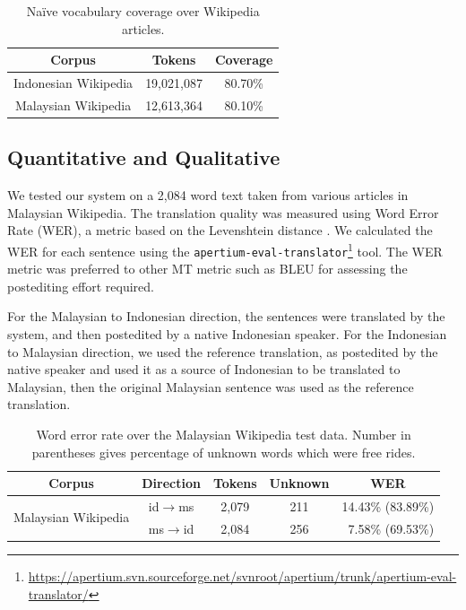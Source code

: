 \documentclass[10pt,a5paper,twoside]{article}
\begin{document}
\begin{table}[htbp]
  \begin{center}
  \begin{tabular}{ccc}
  \toprule
  \bf{Corpus} & \bf{Tokens} & \bf{Coverage}\\
  \midrule
  Indonesian Wikipedia & 19,021,087 & 80.70\% \\
  \midrule
  Malaysian Wikipedia & 12,613,364 & 80.10\% \\
  \bottomrule
  \end{tabular}
  \caption{Na\"ive vocabulary coverage over Wikipedia articles.}
  \label{table:coverage}
  \end{center}
\end{table}

\subsection{Quantitative and Qualitative}
We tested our system on a 2,084 word text taken from various articles in Malaysian Wikipedia. The translation quality was measured using Word Error Rate (WER), a metric based on the Levenshtein distance \citep{levenshtein/1966}. We calculated the WER for each sentence using the \texttt{\small{apertium-eval-translator}}\footnote{\url{https://apertium.svn.sourceforge.net/svnroot/apertium/trunk/apertium-eval-translator/}} tool. The WER metric was preferred to other MT metric such as BLEU \citep{Papineni2002bleu} for assessing the postediting effort required.

For the Malaysian to Indonesian direction, the sentences were translated by the system, and then postedited by a native Indonesian speaker. For the Indonesian to Malaysian direction, we used the reference translation, as postedited by the native speaker and used it as a source of Indonesian to be translated to Malaysian, then the original Malaysian sentence was used as the reference translation.

\begin{table}[htbp]
  \begin{center}
  \begin{tabular}{ccccr}
  \toprule
  \bf{Corpus}                 & \bf{Direction}         & \bf{Tokens}  & \bf{Unknown} & \multicolumn{1}{c}{\bf{WER}}  \\
  \midrule
  \multirow{2}{*}{Malaysian Wikipedia} & id$\rightarrow$ms & 2,079     & 211  & 14.43\% (83.89\%) \\
                          & ms$\rightarrow$id & 2,084     & 256  & 7.58\% (69.53\%)  \\
  \bottomrule
  \end{tabular}
    \caption{Word error rate over the Malaysian Wikipedia test data. Number in parentheses gives percentage of unknown words which were free rides.}
    \label{table:wer}
  \end{center}
\end{table}
\end{document}
